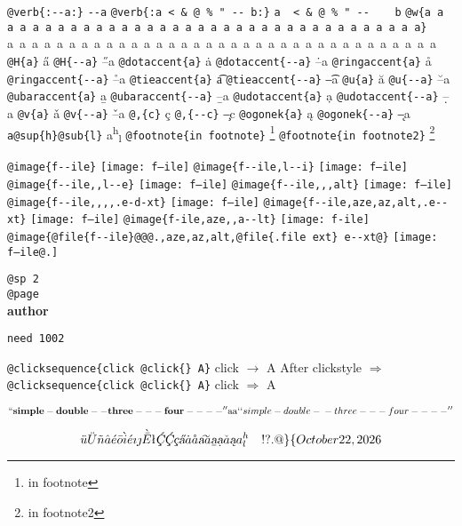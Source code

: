 \documentclass{book}
\renewcommand{\includegraphics}[1]{\fbox{FIG #1}}
\begin{document}
\texttt{@verb\{:{-}{-}a:\}} \verb:--a:
\texttt{@verb\{:a  < \& @ \% " {-}{-}    b:\}} \verb:a  < & @ % " --    b:
\texttt{@w\{a a a a a a a a a a a a a a a a a a a a a a a a a a a a a a a a a a a\}} \hbox{a a a a a a a a a a a a a a a a a a a a a a a a a a a a a a a a a a a}
\texttt{@H\{a\}} \H{a}
\texttt{@H\{{-}{-}a\}} \H{--a}
\texttt{@dotaccent\{a\}} \.{a}
\texttt{@dotaccent\{{-}{-}a\}} \.{--a}
\texttt{@ringaccent\{a\}} \r{a}
\texttt{@ringaccent\{{-}{-}a\}} \r{--a}
\texttt{@tieaccent\{a\}} \t{a}
\texttt{@tieaccent\{{-}{-}a\}} \t{--a}
\texttt{@u\{a\}} \u{a}
\texttt{@u\{{-}{-}a\}} \u{--a}
\texttt{@ubaraccent\{a\}} \b{a}
\texttt{@ubaraccent\{{-}{-}a\}} \b{--a}
\texttt{@udotaccent\{a\}} \d{a}
\texttt{@udotaccent\{{-}{-}a\}} \d{--a}
\texttt{@v\{a\}} \v{a}
\texttt{@v\{{-}{-}a\}} \v{--a}
\texttt{@,\{c\}} \c{c}
\texttt{@,\{{-}{-}c\}} \c{--c}
\texttt{@ogonek\{a\}} \k{a}
\texttt{@ogonek\{{-}{-}a\}} \k{--a}
\texttt{a@sup\{h\}@sub\{l\}} a\textsuperscript{h}\textsubscript{l}
\texttt{@footnote\{in footnote\}} \footnote{in footnote}
\texttt{@footnote\{in footnote2\}} \footnote{in footnote2}

\texttt{@image\{f{-}{-}ile\}} \texttt{[image: f--ile]}
\texttt{@image\{f{-}{-}ile,l{-}{-}i\}} \texttt{[image: f--ile]}
\texttt{@image\{f{-}{-}ile,,l{-}{-}e\}} \texttt{[image: f--ile]}
\texttt{@image\{f{-}{-}ile,,,alt\}} \texttt{[image: f--ile]}
\texttt{@image\{f{-}{-}ile,,,,.e-d-xt\}} \texttt{[image: f--ile]}
\texttt{@image\{f{-}{-}ile,aze,az,alt,.e{-}{-}xt\}} \texttt{[image: f--ile]}
\texttt{@image\{f-ile,aze,,a{-}{-}lt\}} \texttt{[image: f-ile]}
\texttt{@image\{@file\{f{-}{-}ile\}@@@.,aze,az,alt,@file\{.file ext\} e{-}{-}xt@\}} \texttt{[image: f--ile@.]}

\texttt{@sp 2}\leavevmode{}\\
\baselineskip %
\texttt{@page}\leavevmode{}\\
\newpage{}%
\phantom{blabla}%
{\bfseries author}%

\texttt{need 1002}
\needspace{1.002pt}%

\texttt{@clicksequence\{click @click\{\} A\}} click $\rightarrow{}$ A
After clickstyle $\Rightarrow{}$
\texttt{@clicksequence\{click @click\{\} A\}} click $\Rightarrow{}$ A

$$
\mathbf{``simple-double--three---four----''} \hbox{aa}
`\hbox{}`simple-double-\hbox{}-three---four----'\hbox{}'
$$

$$
\ddot{u} \ddot{U} \tilde{n} \hat{a} \acute{e} \bar{o} \grave{i} \acute{e} \imath{} \jmath{} \grave{\bar{E}}
\mathord{\text{\l{}}} \textsl{\c{\'{C}}} \textsl{\c{\'{C}}} \textsl{\c{c}} \textsl{\H{a}} \dot{a} \mathring{a} \textsl{\t{a}}
\breve{a} \textsl{\b{a}} \textsl{\d{a}} \check{a} \textsl{\k{a}} a^{h}_{l}
 \ {}\ {} \ {}\-{}   ! ? . @ \} \{ 
\today{}
$$
\end{document}
